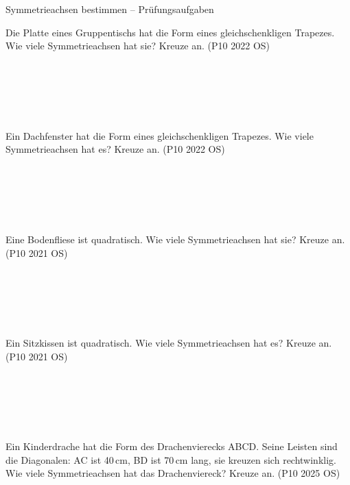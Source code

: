 \begin{aufgabe}{Symmetrieachsen bestimmen – Prüfungsaufgaben}
\begin{teile}
\teil Die Platte eines Gruppentischs hat die Form eines gleichschenkligen Trapezes. Wie viele Symmetrieachsen hat sie? Kreuze an. \hfill (P10 2022 OS) \\  \\  \\  \\  \\  \\ 

\teil Ein Dachfenster hat die Form eines gleichschenkligen Trapezes. Wie viele Symmetrieachsen hat es? Kreuze an. \hfill (P10 2022 OS) \\  \\  \\  \\  \\  \\ 

\teil Eine Bodenfliese ist quadratisch. Wie viele Symmetrieachsen hat sie? Kreuze an. \hfill (P10 2021 OS) \\  \\  \\  \\  \\  \\ 

\teil Ein Sitzkissen ist quadratisch. Wie viele Symmetrieachsen hat es? Kreuze an. \hfill (P10 2021 OS) \\  \\  \\  \\  \\  \\ 

\teil Ein Kinderdrache hat die Form des Drachenvierecks ABCD. Seine Leisten sind die Diagonalen: AC ist 40\,cm, BD ist 70\,cm lang, sie kreuzen sich rechtwinklig. Wie viele Symmetrieachsen hat das Drachenviereck? Kreuze an. \hfill (P10 2025 OS) \\  \\  \\  \\  \\ 


\end{teile}
\end{aufgabe}
